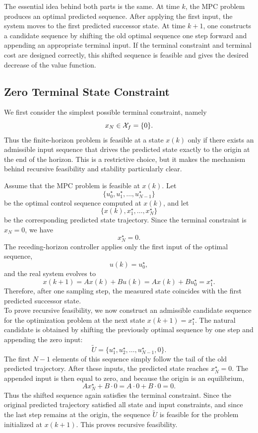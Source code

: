 The essential idea behind both parts is the same. At time \(k\), the MPC problem produces an
optimal predicted sequence. After applying the first input, the system moves to the first
predicted successor state. At time \(k+1\), one constructs a candidate sequence by shifting the
old optimal sequence one step forward and appending an appropriate terminal input. If the
terminal constraint and terminal cost are designed correctly, this shifted sequence is feasible
and gives the desired decrease of the value function.

\subsection{Zero Terminal State Constraint}

We first consider the simplest possible terminal constraint, namely
\[
    x_N \in \mathcal{X}_f = \{0\}.
\]
Thus the finite-horizon problem is feasible at a state \(x(k)\) only if there exists an admissible
input sequence that drives the predicted state exactly to the origin at the end of the horizon.
This is a restrictive choice, but it makes the mechanism behind recursive feasibility and stability
particularly clear.

Assume that the MPC problem is feasible at \(x(k)\). Let
\[
    \{u_0^\star,u_1^\star,\ldots,u_{N-1}^\star\}
\]
be the optimal control sequence computed at \(x(k)\), and let
\[
    \{x(k),x_1^\star,\ldots,x_N^\star\}
\]
be the corresponding predicted state trajectory. Since the terminal constraint is \(x_N=0\), we
have
\[
    x_N^\star = 0.
\]
The receding-horizon controller applies only the first input of the optimal sequence,
\[
    u(k)=u_0^\star,
\]
and the real system evolves to
\[
    x(k+1)=Ax(k)+Bu(k)=Ax(k)+Bu_0^\star=x_1^\star.
\]
Therefore, after one sampling step, the measured state coincides with the first predicted
successor state.\\
To prove recursive feasibility, we now construct an admissible candidate sequence for the
optimization problem at the next state \(x(k+1)=x_1^\star\). The natural candidate is obtained
by shifting the previously optimal sequence by one step and appending the zero input:
\[
    \widetilde{U}
    =
    \{u_1^\star,u_2^\star,\ldots,u_{N-1}^\star,0\}.
\]
The first \(N-1\) elements of this sequence simply follow the tail of the old predicted trajectory.
After these inputs, the predicted state reaches \(x_N^\star=0\). The appended input is then
equal to zero, and because the origin is an equilibrium,
\[
    A x_N^\star + B\cdot 0
    =
    A\cdot 0 + B\cdot 0
    =
    0.
\]
Thus the shifted sequence again satisfies the terminal constraint. Since the original predicted
trajectory satisfied all state and input constraints, and since the last step remains at the origin,
the sequence \(\widetilde{U}\) is feasible for the problem initialized at \(x(k+1)\). This proves
recursive feasibility.

